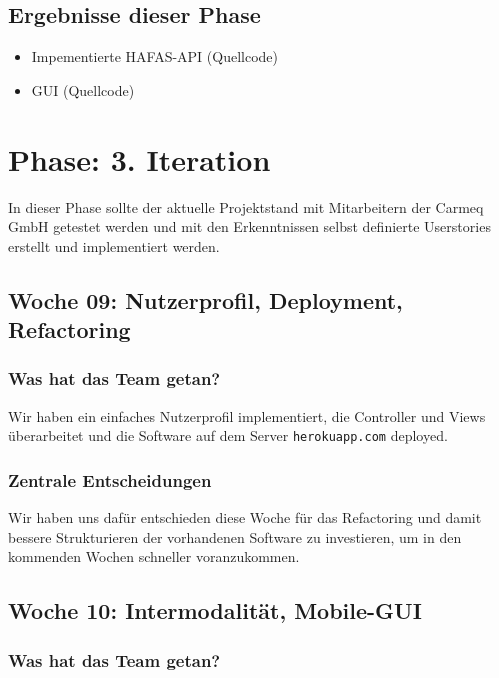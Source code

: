 \documentclass{article}
\begin{document}
\subsection{Ergebnisse dieser Phase}

\begin{itemize}
\item Impementierte HAFAS-API (Quellcode)
\item GUI (Quellcode)
\end{itemize}


\section{Phase: 3. Iteration}

In dieser Phase sollte der aktuelle Projektstand mit Mitarbeitern der Carmeq GmbH getestet werden und mit den Erkenntnissen selbst definierte Userstories erstellt und implementiert werden.

\subsection{Woche 09: Nutzerprofil, Deployment, Refactoring}

\subsubsection{Was hat das Team getan?}

Wir haben ein einfaches Nutzerprofil implementiert, die Controller und Views \"uberarbeitet und die Software auf dem Server \texttt{herokuapp.com} deployed.

\subsubsection{Zentrale Entscheidungen}

Wir haben uns dafür entschieden diese Woche für das Refactoring und damit bessere Strukturieren der vorhandenen Software zu investieren, um in den kommenden Wochen schneller voranzukommen.

\subsection{Woche 10: Intermodalit\"at, Mobile-GUI}

\subsubsection{Was hat das Team getan?}
\end{document}

